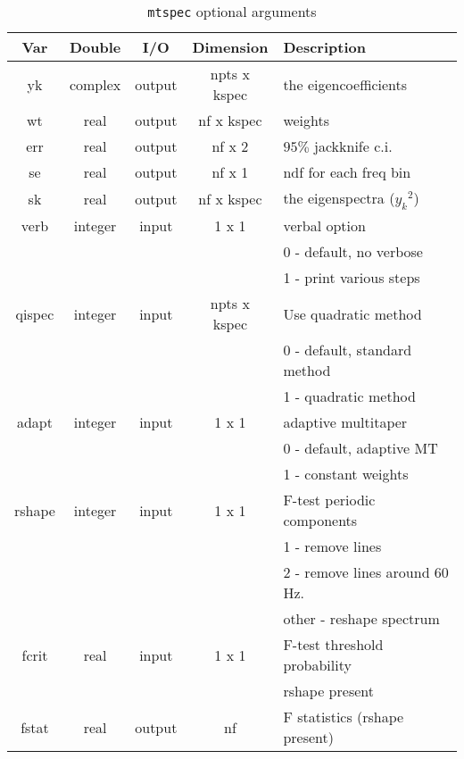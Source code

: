 \documentclass{article}
\begin{document}
\begin{table}[!h]
\caption{\texttt{mtspec} optional arguments}
\begin{center}
\begin{tabular}{|c|c|c|c|l|}
\hline
\textbf{Var} &	\textbf{Double}	& \textbf{I/O}&	\textbf{Dimension}	&	\textbf{Description}		\\
\hline \hline
yk		&	complex	& output &	npts x kspec		&	the eigencoefficients 	\\
wt		&	real	& output &	nf x kspec		&	weights 			\\
err		&	real	& output &	nf x 2 		&	$95\% $ jackknife c.i.	\\
se		&	real	& output &	nf x 1			&	ndf for each freq bin				\\
sk		&	real	& output &	nf x kspec			&	the eigenspectra (${y_k}^2$)		\\
verb		&	integer	& input &	1 x 1			&	verbal option \\
		&		& 	 &			&	0 - default, no verbose	\\
		&		& 	 &			&	1 - print various steps	\\
qispec		&	integer	& input &	npts x kspec		&	Use quadratic method			\\
		&		&  &			&	0 - default, standard method	\\
				&		&  &			&	1 - quadratic method	\\
adapt	&	integer	& input &	1 x 1			&	adaptive multitaper		\\
		&		&  &			&	0 - default, adaptive MT	\\
				&		&  &			&	1 - constant weights	\\
rshape	&	integer	& input &	1 x 1			&	F-test periodic components		\\
		&		&  &					&	1 - remove lines	\\
				&		&  &			&	2 - remove lines around 60 Hz. 	\\
								&		&  &			&	other - reshape spectrum \\
fcrit		&	real	& input &	1 x 1				&	F-test threshold probability 			\\
								&		&  &			&	rshape present \\
fstat	&	real	& output &	nf				&	F statistics  (rshape present)	\\
\hline
\end{tabular}
\end{center}
\label{tab:mtspec_opt}
\end{table}%
\end{document}
